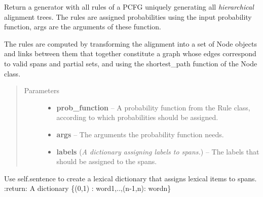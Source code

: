 \documentclass[letterpaper,10pt,english]{sphinxmanual}
\begin{document}
\begin{fulllineitems}

\begin{fulllineitems}
\label{alignments:alignments.Alignments.hat_rules}
Return a generator with all rules of a PCFG
uniquely generating all \emph{hierarchical} alignment trees. The rules
are assigned probabilities using the input probability function, args
are the arguments of these function.

The rules are computed by transforming the alignment into a set
of Node objects and links between them that together constitute a
graph whose edges correspond to valid spans and partial
sets, and using the shortest\_path function of the Node class.
\begin{quote}\begin{description}
\item[{Parameters}] \leavevmode\begin{itemize}
\item {} 
\textbf{prob\_function} -- A probability function from the Rule class, according to which
probabilities should be assigned.

\item {} 
\textbf{args} -- The arguments the probability function needs.

\item {} 
\textbf{labels} (\emph{A dictionary assigning labels to spans.}) -- The labels that should be assigned to the spans.

\end{itemize}

\end{description}\end{quote}

\end{fulllineitems}


\begin{fulllineitems}
\label{alignments:alignments.Alignments.lex_dict}
Use self.sentence to create a lexical dictionary
that assigns lexical items to spans.
:return: A dictionary \{(0,1) : word1,..,(n-1,n): wordn\}

\end{fulllineitems}



\end{fulllineitems}
\end{document}
